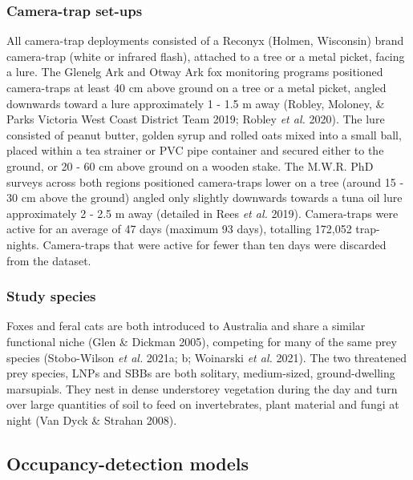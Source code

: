 \documentclass[]{elsarticle} %
\begin{document}
\hypertarget{camera-trap-set-ups}{%
\subsubsection{Camera-trap set-ups}\label{camera-trap-set-ups}}

All camera-trap deployments consisted of a Reconyx (Holmen, Wisconsin) brand camera-trap (white or infrared flash), attached to a tree or a metal picket, facing a lure. The Glenelg Ark and Otway Ark fox monitoring programs positioned camera-traps at least 40 cm above ground on a tree or a metal picket, angled downwards toward a lure approximately 1 - 1.5 m away (Robley, Moloney, \& Parks Victoria West Coast District Team 2019; Robley \emph{et al.} 2020). The lure consisted of peanut butter, golden syrup and rolled oats mixed into a small ball, placed within a tea strainer or PVC pipe container and secured either to the ground, or 20 - 60 cm above ground on a wooden stake. The M.W.R. PhD surveys across both regions positioned camera-traps lower on a tree (around 15 - 30 cm above the ground) angled only slightly downwards towards a tuna oil lure approximately 2 - 2.5 m away (detailed in Rees \emph{et al.} 2019). Camera-traps were active for an average of 47 days (maximum 93 days), totalling 172,052 trap-nights. Camera-traps that were active for fewer than ten days were discarded from the dataset.

\hypertarget{study-species}{%
\subsubsection{Study species}\label{study-species}}

Foxes and feral cats are both introduced to Australia and share a similar functional niche (Glen \& Dickman 2005), competing for many of the same prey species (Stobo-Wilson \emph{et al.} 2021a; b; Woinarski \emph{et al.} 2021). The two threatened prey species, LNPs and SBBs are both solitary, medium-sized, ground-dwelling marsupials. They nest in dense understorey vegetation during the day and turn over large quantities of soil to feed on invertebrates, plant material and fungi at night (Van Dyck \& Strahan 2008).

\hypertarget{occupancy-detection-models}{%
\subsection{Occupancy-detection models}\label{occupancy-detection-models}}
\end{document}
